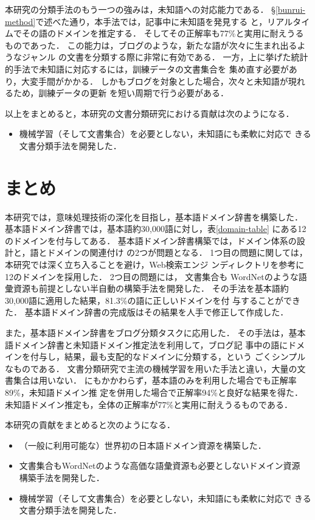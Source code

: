 \documentclass[japanese]{jnlp_1.4}
\begin{document}
本研究の分類手法のもう一つの強みは，未知語への対応能力である．
\S\ref{bunrui-method}で述べた通り，本手法では，記事中に未知語を発見する
と，リアルタイムでその語のドメインを推定する．
そしてその正解率も77\%と実用に耐えうるものであった．
この能力は，ブログのような，新たな語が次々に生まれ出るようなジャンル
の文書を分類する際に非常に有効である．
一方，上に挙げた統計的手法で未知語に対応するには，訓練データの文書集合を
集め直す必要があり，大変手間がかかる．
しかもブログを対象とした場合，次々と未知語が現れるため，訓練データの更新
を短い周期で行う必要がある．

以上をまとめると，本研究の文書分類研究における貢献は次のようになる．

\begin{itemize}
 \item 機械学習（そして文書集合）を必要としない，未知語にも柔軟に対応で
       きる文書分類手法を開発した．
\end{itemize}


\section{まとめ \label{conclusion}}

本研究では，意味処理技術の深化を目指し，基本語ドメイン辞書を構築した．
基本語ドメイン辞書では，基本語約30,000語に対し，表\ref{domain-table}
にある12のドメインを付与してある．
基本語ドメイン辞書構築では，ドメイン体系の設計と，語とドメインの関連付け
の2つが問題となる．
1つ目の問題に関しては，本研究では深く立ち入ることを避け，Web検索エンジ
ンディレクトリを参考に12のドメインを採用した．
2つ目の問題には，
文書集合も
WordNetのような語彙資源も前提としない半自動の構築手法を開発した．
その手法を基本語約30,000語に適用した結果，81.3\%の語に正しいドメインを付
与することができた．
基本語ドメイン辞書の完成版はその結果を人手で修正して作成した．

また，基本語ドメイン辞書をブログ分類タスクに応用した．
その手法は，基本語ドメイン辞書と未知語ドメイン推定法を利用して，ブログ記
事中の語にドメインを付与し，結果，最も支配的なドメインに分類する，という
ごくシンプルなものである．
文書分類研究で主流の機械学習を用いた手法と違い，大量の文書集合は用いない．
にもかかわらず，基本語のみを利用した場合でも正解率89\%，未知語ドメイン推
定を併用した場合で正解率94\%と良好な結果を得た．
未知語ドメイン推定も，全体の正解率が77\%と実用に耐えうるものである．

本研究の貢献をまとめると次のようになる．

\begin{itemize}
 \item （一般に利用可能な）世界初の日本語ドメイン資源を構築した．
 \item 文書集合もWordNetのような高価な語彙資源も必要としないドメイン資源
       構築手法を開発した．
 \item 機械学習（そして文書集合）を必要としない，未知語にも柔軟に対応で
       きる文書分類手法を開発した．
\end{itemize}
\end{document}
